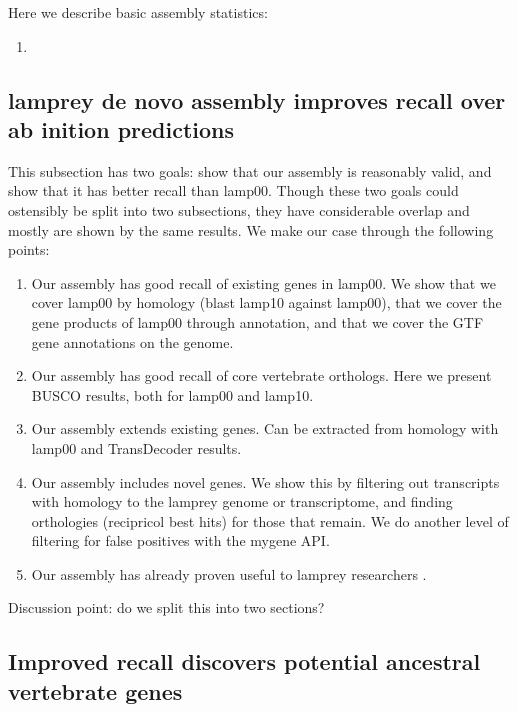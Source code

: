 \documentclass{article}
\begin{document}
Here we describe basic assembly statistics:

\begin{enumerate}

\item 

\end{enumerate}

\subsection*{lamprey de novo assembly improves recall over ab inition predictions}

This subsection has two goals: show that our assembly is reasonably valid, and show that it has better recall than lamp00.
Though these two goals could ostensibly be split into two subsections, they have considerable overlap and mostly are shown by the same results. We make our case
through the following points:

\begin{enumerate}
\item Our assembly has good recall of existing genes in lamp00. We show that we cover lamp00 by homology (blast lamp10 against lamp00), that we cover the gene products of lamp00 through annotation, and that we cover the GTF gene annotations on the genome.
\item Our assembly has good recall of core vertebrate orthologs. Here we present BUSCO results, both for lamp00 and lamp10.
\item Our assembly extends existing genes. Can be extracted from homology with lamp00 and TransDecoder results.
\item Our assembly includes novel genes. We show this by filtering out transcripts with homology to the lamprey genome or transcriptome, and finding orthologies (recipricol best hits) for those that remain. We do another level of filtering for false positives with the mygene API.
\item Our assembly has already proven useful to lamprey researchers \cite{ren_genome-wide_2015}.
\end{enumerate}

Discussion point: do we split this into two sections?

\subsection*{Improved recall discovers potential ancestral vertebrate genes}
\end{document}

